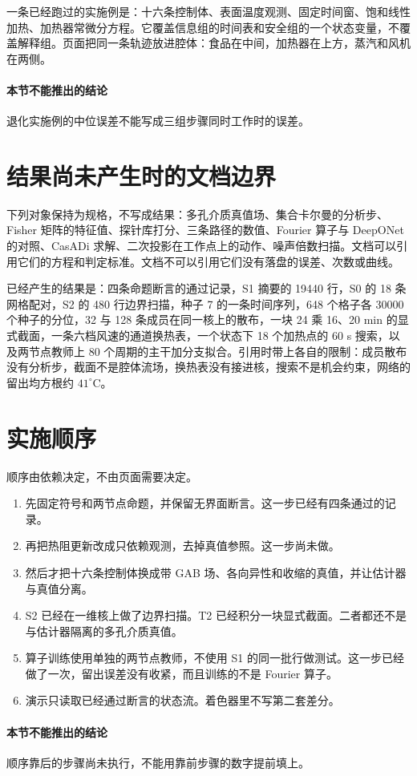 一条已经跑过的实施例是：十六条控制体、表面温度观测、固定时间窗、饱和线性加热、加热器常微分方程。它覆盖信息组的时间表和安全组的一个状态变量，不覆盖解释组。页面把同一条轨迹放进腔体：食品在中间，加热器在上方，蒸汽和风机在两侧。

\paragraph{本节不能推出的结论}
退化实施例的中位误差不能写成三组步骤同时工作时的误差。

\section{结果尚未产生时的文档边界}

下列对象保持为规格，不写成结果：多孔介质真值场、集合卡尔曼的分析步、Fisher 矩阵的特征值、探针库打分、三条路径的数值、Fourier 算子与 DeepONet 的对照、CasADi 求解、二次投影在工作点上的动作、噪声倍数扫描。文档可以引用它们的方程和判定标准。文档不可以引用它们没有落盘的误差、次数或曲线。

已经产生的结果是：四条命题断言的通过记录，S1 摘要的 19440 行，S0 的 18 条网格配对，S2 的 480 行边界扫描，种子 7 的一条时间序列，648 个格子各 30000 个种子的分位，32 与 128 条成员在同一核上的散布，一块 24 乘 16、20 min 的显式截面，一条六档风速的通道换热表，一个状态下 18 个加热点的 60 s 搜索，以及两节点教师上 80 个周期的主干加分支拟合。引用时带上各自的限制：成员散布没有分析步，截面不是腔体流场，换热表没有接进核，搜索不是机会约束，网络的留出均方根约 \(41^\circ\mathrm{C}\)。

\section{实施顺序}

顺序由依赖决定，不由页面需要决定。

\begin{enumerate}
\item 先固定符号和两节点命题，并保留无界面断言。这一步已经有四条通过的记录。
\item 再把热阻更新改成只依赖观测，去掉真值参照。这一步尚未做。
\item 然后才把十六条控制体换成带 GAB 场、各向异性和收缩的真值，并让估计器与真值分离。
\item S2 已经在一维核上做了边界扫描。T2 已经积分一块显式截面。二者都还不是与估计器隔离的多孔介质真值。
\item 算子训练使用单独的两节点教师，不使用 S1 的同一批行做测试。这一步已经做了一次，留出误差没有收紧，而且训练的不是 Fourier 算子。
\item 演示只读取已经通过断言的状态流。着色器里不写第二套差分。
\end{enumerate}

\paragraph{本节不能推出的结论}
顺序靠后的步骤尚未执行，不能用靠前步骤的数字提前填上。
